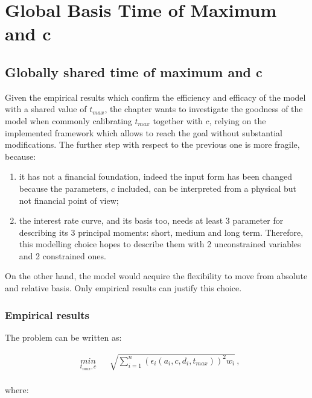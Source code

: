 \chapter{Global Basis Time of Maximum and c}
\label{chap:fixing_t_c}

\section{Globally shared time of maximum and c}

Given the empirical results which confirm the efficiency and efficacy of the model with a shared value of $t_{max}$, the chapter wants to investigate the goodness of the model when commonly calibrating $t_{max}$ together with $c$, relying on the implemented framework which allows to reach the goal without substantial modifications. 
The further step with respect to the previous one is more fragile, because:

\begin{enumerate}
    \item it has not a financial foundation, indeed the input form has been changed because the parameters, $c$ included, can be interpreted from a physical but not financial point of view;
    \item the interest rate curve, and its basis too, needs at least 3 parameter for describing its 3 principal moments: short, medium and long term. Therefore, this modelling choice hopes to describe them with 2 unconstrained variables and 2 constrained ones.
\end{enumerate}

On the other hand, the model would acquire the flexibility to move from absolute and relative basis.
Only empirical results can justify this choice.
 
\subsection{Empirical results}

The problem can be written as:

\begin{equation*}
\begin{aligned}
& \underset{t_{max},c}{min}
& & \sqrt{\sum_{i=1}^{n}(\epsilon_{i}(a_{i},c,d_{i},t_{max}))^{2}w_{i}}\,, \\
\end{aligned}
\end{equation*}

where:

